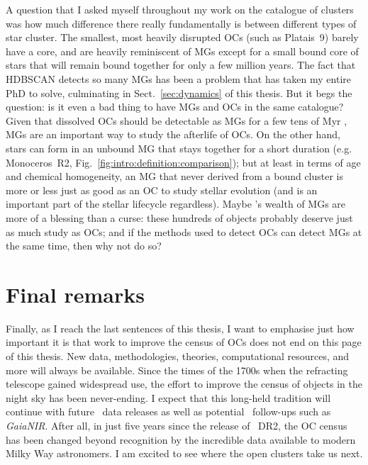 A question that I asked myself throughout my work on the catalogue of clusters was how much difference there really fundamentally is between different types of star cluster. The smallest, most heavily disrupted OCs (such as Platais~9) barely have a core, and are heavily reminiscent of MGs except for a small bound core of stars that will remain bound together for only a few million years. The fact that HDBSCAN detects so many MGs has been a problem that has taken my entire PhD to solve, culminating in Sect.~\ref{sec:dynamics} of this thesis. But it begs the question: is it even a bad thing to have MGs and OCs in the same catalogue? Given that dissolved OCs should be detectable as MGs for a few tens of Myr \citep{portegies_zwart_young_2010}, MGs are an important way to study the afterlife of OCs. On the other hand, stars can form in an unbound MG that stays together for a short duration (e.g. Monoceros~R2, Fig.~\ref{fig:intro:definition:comparison}); but at least in terms of age and chemical homogeneity, an MG that never derived from a bound cluster is more or less just as good as an OC to study stellar evolution (and is an important part of the stellar lifecycle regardless). Maybe \gaia's wealth of MGs are more of a blessing than a curse: these hundreds of objects probably deserve just as much study as OCs; and if the methods used to detect OCs can detect MGs at the same time, then why not do so?


\section{Final remarks}

Finally, as I reach the last sentences of this thesis, I want to emphasise just how important it is that work to improve the census of OCs does not end on this page of this thesis. New data, methodologies, theories, computational resources, and more will always be available. Since the times of the 1700s when the refracting telescope gained widespread use, the effort to improve the census of objects in the night sky has been never-ending. I expect that this long-held tradition will continue with future \gaia\ data releases as well as potential \gaia\ follow-ups such as \emph{GaiaNIR}. After all, in just five years since the release of \gaia\ DR2, the OC census has been changed beyond recognition by the incredible data available to modern Milky Way astronomers. I am excited to see where the open clusters take us next.







